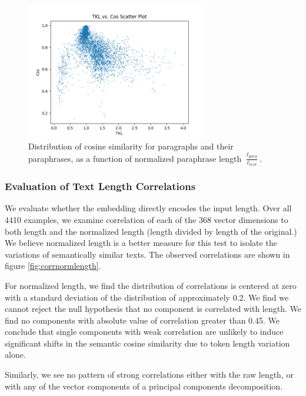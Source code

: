 \documentclass{article}
\begin{document}
{\begin{figure}
	\centering
	\includegraphics[height=6cm]{tkl_cos.png}
	\caption{Distribution of cosine similarity for paragraphs and their paraphrases, as a function of normalized paraphrase length $\frac{\ell_{para}}{\ell_{text}}$. }
	\label{fig:paraphrase_normlength}
\end{figure}


\subsubsection{Evaluation of Text Length Correlations}

We evaluate whether the embedding directly encodes the input length.
Over all 4410 examples, we examine correlation of each of the 368 vector dimensions to both length and the normalized length (length divided by length of the original.) 
We believe normalized length is a better measure for this test to isolate the variations of semantically similar texts.
The observed correlations are shown in figure \ref{fig:corrnormlength}.

For normalized length, we find the distribution of correlations is centered at zero with a standard deviation of the distribution of approximately 0.2.  
We find we cannot reject the null hypothesis that no component is correlated with length.  
We find no components with absolute value of correlation greater than 0.45.
We conclude that single components with weak correlation are unlikely to induce significant shifts in the semantic cosine similarity due to token length variation alone.

Similarly, we see no pattern of strong correlations either with the raw length, or with any of the vector components of a principal components decomposition.

}
\end{document}
